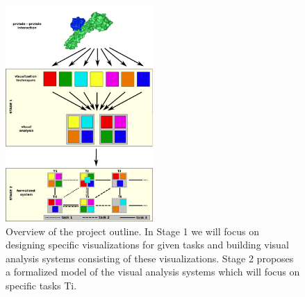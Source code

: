 \documentclass[11pt,a4paper,titlepage,oneside,onecolumn]{article}
\begin{document}
\setlength\intextsep{0pt}
\begin{figure}
\vspace{-5mm}
\begin{center}
\includegraphics[width=0.5\textwidth,height=0.7\textwidth]{pics/systemsmall.png}
\end{center}
\vspace{-5mm}
\caption{Overview of the project outline. In Stage 1 we will focus on designing specific visualizations for given tasks and building visual analysis systems consisting of these visualizations. Stage 2 proposes a formalized model of the visual analysis systems which will focus on specific tasks Ti.}
\label{fig:system}
\end{figure}
\end{document}
